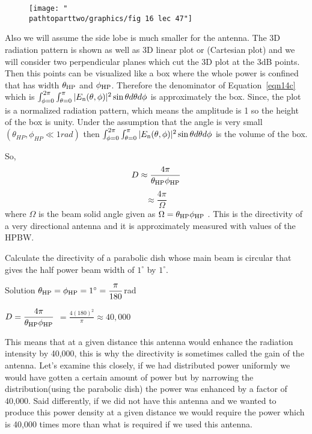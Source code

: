 \begin{enumerate}
\begin{figure}[h]
\centering
\texttt{[image: "\\pathtoparttwo/graphics/fig 16 lec 47"]}
\label{figure16}
\end{figure}

Also we will assume the side lobe is much smaller for the antenna. The 3D radiation pattern is shown as well as 3D linear plot or (Cartesian plot) and we will consider two perpendicular planes which cut the 3D plot at the 3dB points. Then this points can be visualized like a box where the whole power is confined that has width $\theta_{\textnormal{HP}}$ and $\phi_{\textnormal{HP}}$. Therefore the denominator of Equation~\ref{eqn14c} which is $\int_{\phi=0}^{2\pi} \int_{\theta=0}^{\pi}|E_{\textnormal{n}}(\theta, \phi)|^{2}\sin\theta d\theta d\phi$ is approximately the box.
Since, the plot is a normalized radiation pattern, which means the amplitude is 1 so the height of the box is unity. Under the assumption that the angle is very small $(\theta_{HP}, \phi_{HP} \ll 1rad)$ then $\int_{\phi=0}^{2\pi} \int_{\theta=0}^{\pi}|E_{\textnormal{n}}(\theta, \phi)|^{2}\sin\theta d\theta d\phi$ is the volume of the box.

So, 
$$D \approx \dfrac{4\pi}{\theta_{\textnormal{HP}}\phi_{\textnormal{HP}}}$$
$$\approx \frac{4\pi}{\Omega}$$
where $\Omega$ is the beam solid angle given as $\Omega =\theta_{\textnormal{HP}}\phi_{\textnormal{HP}} $ .
This is the directivity of a very directional antenna and it is approximately measured with values of the HPBW.	
\end{enumerate}	
\begin{exmp}
Calculate the directivity of a parabolic dish whose main beam is circular that gives the half power beam width of $1^\circ$ by $1^\circ$.
\begin{center}
Solution
$\theta_{\textnormal{HP}} =\phi_{\textnormal{HP}} =1^{\circ
}=\dfrac{\pi}{180}$rad


$D=\dfrac{4\pi}{\theta_{\textnormal{HP}}\phi_{\textnormal{HP}}}$
$= \frac{4(180)^2}{\pi} \approx 40,000$
\end{center}
\end{exmp}

This means that at a given distance this antenna would enhance the radiation intensity by 40,000, this is why the directivity is sometimes called the gain of the antenna. Let's examine this closely, if we had distributed power uniformly we would have gotten a certain amount of power but by narrowing the distribution(using the parabolic dish) the power was enhanced by a factor of 40,000. Said differently, if we did not have this antenna and we wanted to produce this power density at a given distance we would require the power which is 40,000 times more than what is required if we used this antenna.

